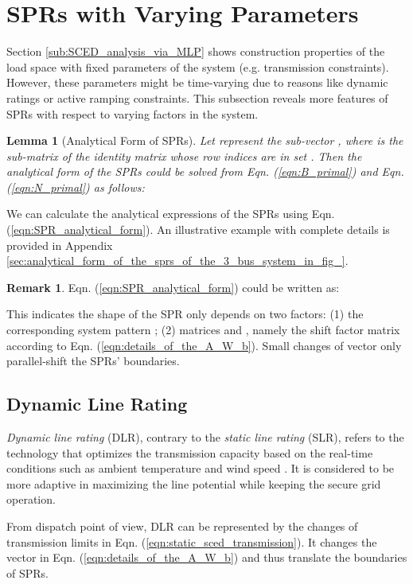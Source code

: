 \documentclass[letterpaper, 11pt]{article}
\theoremstyle{plain}
\newtheorem{lem}{Lemma}
\theoremstyle{definition}
\newtheorem{remark}{Remark}
\begin{document}
\section{SPRs with Varying Parameters} \label{sec:sprs_with_varying_parameters}

Section \ref{sub:SCED_analysis_via_MLP} shows construction properties of the load space with fixed parameters of the system (e.g. transmission constraints). However, these parameters might be time-varying due to reasons like dynamic ratings or active ramping constraints. This subsection reveals more features of SPRs with respect to varying factors in the system.


\begin{lem}[Analytical Form of SPRs]
Let  represent the sub-vector , where  is the sub-matrix of the identity matrix  whose row indices are in set .
Then the analytical form of the SPRs could be solved from Eqn. (\ref{eqn:B_primal}) and Eqn. (\ref{eqn:N_primal}) as follows:

\end{lem}
We can calculate the analytical expressions of the SPRs using Eqn. (\ref{eqn:SPR_analytical_form}). An illustrative example with complete details is provided in Appendix \ref{sec:analytical_form_of_the_sprs_of_the_3_bus_system_in_fig_}.

\begin{remark}
Eqn. (\ref{eqn:SPR_analytical_form}) could be written as:

This indicates the shape of the SPR  only depends on two factors: (1) the corresponding system pattern ; (2) matrices  and , namely the shift factor matrix  according to Eqn. (\ref{eqn:details_of_the_A_W_b}).
Small changes of vector  only parallel-shift the SPRs' boundaries.
\end{remark}


\subsection{Dynamic Line Rating} \label{sub:dynamic_line_rating}
\emph{Dynamic line rating} (DLR), contrary to the \emph{static line rating} (SLR),  refers to the technology that optimizes the transmission capacity based on the real-time conditions such as ambient temperature and wind speed \cite{douglass1996real}.
It is considered to be more adaptive in maximizing the line potential while keeping the secure grid operation.

From dispatch point of view, DLR can be represented by the changes of transmission limits  in Eqn. (\ref{eqn:static_sced_transmission}). It changes the vector  in Eqn. (\ref{eqn:details_of_the_A_W_b}) and thus translate the boundaries of SPRs.
\end{document}
